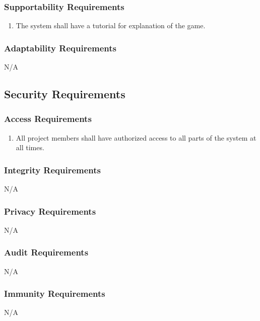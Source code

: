 \documentclass[]{article}
\begin{document}
\subsubsection{Supportability Requirements}
\label{ssub:supportability_requirements}
\begin{enumerate}[start=1, label={MS\arabic*.}]
    \item The system shall have a tutorial for explanation of the game.
\end{enumerate}

\subsubsection{Adaptability Requirements}
\label{ssub:adaptability_requirements}
N/A

\subsection{Security Requirements}
\label{sub:security_requirements}

\subsubsection{Access Requirements}
\label{ssub:access_requirements}
\begin{enumerate}[start=1, label={SR\arabic*.}]
    \item All project members shall have authorized access to all parts of the 
    system at all times.
\end{enumerate}

\subsubsection{Integrity Requirements}
\label{ssub:integrity_requirements}
N/A

\subsubsection{Privacy Requirements}
\label{ssub:privacy_requirements}
N/A

\subsubsection{Audit Requirements}
\label{ssub:audit_requirements}
N/A

\subsubsection{Immunity Requirements}
\label{ssub:immunity_requirements}
N/A
\end{document}
